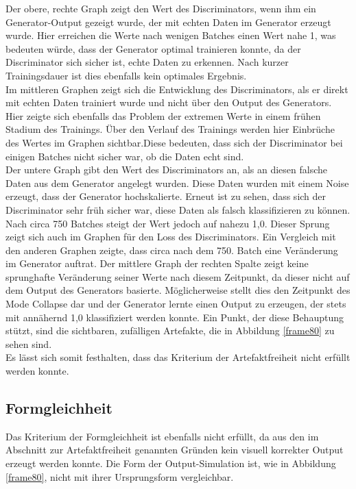 Der obere, rechte Graph zeigt den Wert des Discriminators, wenn ihm ein Generator-Output gezeigt wurde, der mit echten Daten im Generator erzeugt wurde. Hier erreichen die Werte nach wenigen Batches einen Wert nahe 1, was bedeuten würde, dass der Generator optimal trainieren konnte, da der Discriminator sich sicher ist, echte Daten zu erkennen. Nach kurzer Trainingsdauer ist dies ebenfalls kein optimales Ergebnis.\\

Im mittleren Graphen zeigt sich die Entwicklung des Discriminators, als er direkt mit echten Daten trainiert wurde und nicht über den Output des Generators. Hier zeigte sich ebenfalls das Problem der extremen Werte in einem frühen Stadium des Trainings. Über den Verlauf des Trainings werden hier Einbrüche des Wertes im Graphen sichtbar.Diese bedeuten, dass sich der Discriminator bei einigen Batches nicht sicher war, ob die Daten echt sind. \\

Der untere Graph gibt den Wert des Discriminators an, als an diesen falsche Daten aus dem Generator angelegt wurden. Diese Daten wurden mit einem Noise erzeugt, dass der Generator hochskalierte. Erneut ist zu sehen, dass sich der Discriminator sehr früh sicher war, diese Daten als falsch klassifizieren zu können. Nach circa 750 Batches steigt der Wert jedoch auf nahezu 1,0. Dieser Sprung zeigt sich auch im Graphen für den Loss des Discriminators. Ein Vergleich mit den anderen Graphen zeigte, dass circa nach dem 750. Batch eine Veränderung im Generator auftrat. Der mittlere Graph der rechten Spalte zeigt keine sprunghafte Veränderung seiner Werte nach diesem Zeitpunkt, da dieser nicht auf dem Output des Generators basierte. Möglicherweise stellt dies den Zeitpunkt des Mode Collapse dar und der Generator lernte einen Output zu erzeugen, der stets mit annähernd 1,0 klassifiziert werden konnte. Ein Punkt, der diese Behauptung stützt, sind die sichtbaren, zufälligen Artefakte, die in Abbildung \ref{frame80} zu sehen sind.\\

Es lässt sich somit festhalten, dass das Kriterium der Artefaktfreiheit nicht erfüllt werden konnte.

\subsection{Formgleichheit} Das Kriterium der Formgleichheit ist ebenfalls nicht erfüllt, da aus den im Abschnitt zur Artefaktfreiheit genannten Gründen kein visuell korrekter Output erzeugt werden konnte. Die Form der Output-Simulation ist, wie in Abbildung \ref{frame80}, nicht mit ihrer Ursprungsform vergleichbar.\\

